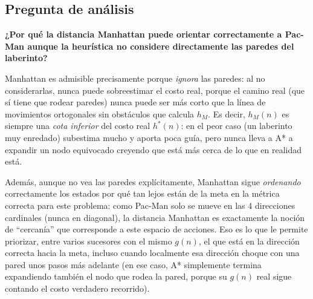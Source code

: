 \subsection{Pregunta de análisis}

\textbf{¿Por qué la distancia Manhattan puede orientar correctamente a Pac-Man aunque la
heurística no considere directamente las paredes del laberinto?}

Manhattan es admisible precisamente porque \emph{ignora} las paredes: al no considerarlas, nunca
puede sobreestimar el costo real, porque el camino real (que sí tiene que rodear paredes) nunca
puede ser más corto que la línea de movimientos ortogonales sin obstáculos que calcula $h_M$. Es
decir, $h_M(n)$ es siempre una \emph{cota inferior} del costo real $h^*(n)$: en el peor caso (un
laberinto muy enredado) subestima mucho y aporta poca guía, pero nunca lleva a A* a expandir un
nodo equivocado creyendo que está más cerca de lo que en realidad está.

Además, aunque no vea las paredes explícitamente, Manhattan sigue \emph{ordenando} correctamente
los estados por qué tan lejos están de la meta en la métrica correcta para este problema: como
Pac-Man solo se mueve en las 4 direcciones cardinales (nunca en diagonal), la distancia Manhattan
es exactamente la noción de ``cercanía'' que corresponde a este espacio de acciones. Eso es lo que
le permite priorizar, entre varios sucesores con el mismo $g(n)$, el que está en la dirección
correcta hacia la meta, incluso cuando localmente esa dirección choque con una pared unos pasos
más adelante (en ese caso, A* simplemente termina expandiendo también el nodo que rodea la pared,
porque su $g(n)$ real sigue contando el costo verdadero recorrido).
